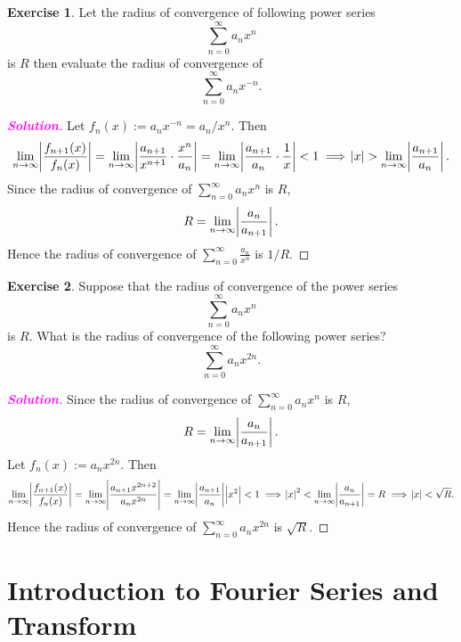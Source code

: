 \documentclass[12pt,openany]{book}
\theoremstyle{definition}
\newtheorem{exercise}{Exercise}[chapter]
\newcommand{\sol}{\textcolor{magenta}{\bf Solution}}
\begin{document}
	\begin{tcolorbox}[colframe=execolor, title={\color{white}\bf}]
		\begin{exercise}
			Let the radius of convergence of following power series
			\[
			\sum_{n=0}^{\infty} a_nx^n
			\]
			is \( R \) then evaluate the radius of convergence of
			\[
			\sum_{n=0}^{\infty} a_nx^{-n}.
			\]
		\end{exercise}
	\end{tcolorbox}
	\begin{proof}[\sol]
		Let $f_n(x):=a_nx^{-n}=a_n/x^n$. Then \begin{align*}
			\lim\limits_{n\to\infty}\abs{\frac{f_{n+1}(x)}{f_n(x)}}=\lim\limits_{n\to\infty}\abs{\frac{a_{n+1}}{x^{n+1}}\cdot\frac{x^n}{a_n}}=\lim\limits_{n\to\infty}\abs{\frac{a_{n+1}}{a_n}\cdot\frac{1}{x}}<1\implies\abs{x}>\lim\limits_{n\to\infty}\abs{\frac{a_{n+1}}{a_n}}.
		\end{align*} Since the radius of convergence of $\sum_{n=0}^\infty a_nx^n$ is $R$, \[
	R=\lim\limits_{n\to\infty}\abs{\frac{a_n}{a_{n+1}}}.
	\] Hence the radius of convergence of $\sum_{n=0}^\infty\frac{a_n}{x^n}$ is $1/R$.
	\end{proof}
	\begin{tcolorbox}[colframe=execolor, title={\color{white}\bf}]
		\begin{exercise}
			Suppose that the radius of convergence of the power series
			\[
			\sum_{n=0}^{\infty} a_nx^n
			\]
			is \( R \). What is the radius of convergence of the following power series?
			\[
			\sum_{n=0}^{\infty} a_nx^{2n}.
			\]
		\end{exercise}
	\end{tcolorbox}
	\begin{proof}[\sol]
		Since the radius of convergence of $\sum_{n=0}^\infty a_nx^n$ is $R$, \[
		R=\lim\limits_{n\to\infty}\abs{\frac{a_n}{a_{n+1}}}.
		\] Let $f_n(x):=a_nx^{2n}$. Then \begin{align*}
			\lim\limits_{n\to\infty}\abs{\frac{f_{n+1}(x)}{f_n(x)}}=\lim\limits_{n\to\infty}\abs{\frac{a_{n+1}x^{2n+2}}{a_nx^{2n}}}=\lim\limits_{n\to\infty}\abs{\frac{a_{n+1}}{a_n}}\abs{x^2}<1\implies\abs{x}^2<\lim\limits_{n\to\infty}\abs{\frac{a_n}{a_{n+1}}}=R\implies \abs{x}<\sqrt{R}.
		\end{align*} 
		Hence the radius of convergence of $\sum_{n=0}^\infty{a_nx^{2n}}$ is $\sqrt{R}$.
	\end{proof}
	\newpage
	\chapter{Introduction to Fourier Series and Transform}
\end{document}
